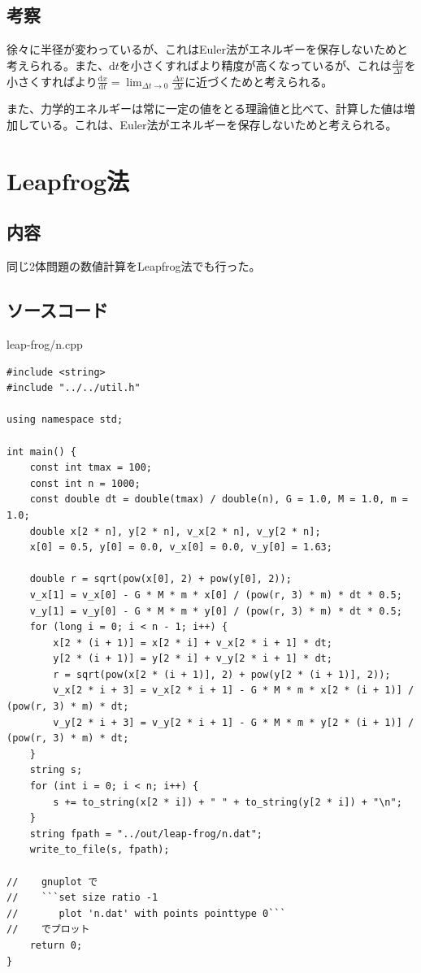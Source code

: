\documentclass[a4paper,twoside]{jarticle}
\begin{document}
\subsection{考察}
徐々に半径が変わっているが、これはEuler法がエネルギーを保存しないためと考えられる。また、$\mathrm{d}t$を小さくすればより精度が高くなっているが、これは$\frac{\Delta x}{\Delta t}$を小さくすればより$\displaystyle \frac{\mathrm{d}x}{\mathrm{d}t}=\lim_{\Delta t \to 0}\frac{\Delta x}{\Delta t}$に近づくためと考えられる。

また、力学的エネルギーは常に一定の値をとる理論値と比べて、計算した値は増加している。これは、Euler法がエネルギーを保存しないためと考えられる。

\section{Leapfrog法}
\subsection{内容}
同じ2体問題の数値計算をLeapfrog法でも行った。

\subsection{ソースコード}
leap-frog/n.cpp
\begin{lstlisting}
#include <string>
#include "../../util.h"

using namespace std;

int main() {
    const int tmax = 100;
    const int n = 1000;
    const double dt = double(tmax) / double(n), G = 1.0, M = 1.0, m = 1.0;
    double x[2 * n], y[2 * n], v_x[2 * n], v_y[2 * n];
    x[0] = 0.5, y[0] = 0.0, v_x[0] = 0.0, v_y[0] = 1.63;

    double r = sqrt(pow(x[0], 2) + pow(y[0], 2));
    v_x[1] = v_x[0] - G * M * m * x[0] / (pow(r, 3) * m) * dt * 0.5;
    v_y[1] = v_y[0] - G * M * m * y[0] / (pow(r, 3) * m) * dt * 0.5;
    for (long i = 0; i < n - 1; i++) {
        x[2 * (i + 1)] = x[2 * i] + v_x[2 * i + 1] * dt;
        y[2 * (i + 1)] = y[2 * i] + v_y[2 * i + 1] * dt;
        r = sqrt(pow(x[2 * (i + 1)], 2) + pow(y[2 * (i + 1)], 2));
        v_x[2 * i + 3] = v_x[2 * i + 1] - G * M * m * x[2 * (i + 1)] / (pow(r, 3) * m) * dt;
        v_y[2 * i + 3] = v_y[2 * i + 1] - G * M * m * y[2 * (i + 1)] / (pow(r, 3) * m) * dt;
    }
    string s;
    for (int i = 0; i < n; i++) {
        s += to_string(x[2 * i]) + " " + to_string(y[2 * i]) + "\n";
    }
    string fpath = "../out/leap-frog/n.dat";
    write_to_file(s, fpath);

//    gnuplot で
//    ```set size ratio -1
//       plot 'n.dat' with points pointtype 0```
//    でプロット
    return 0;
}
\end{lstlisting}
\end{document}
